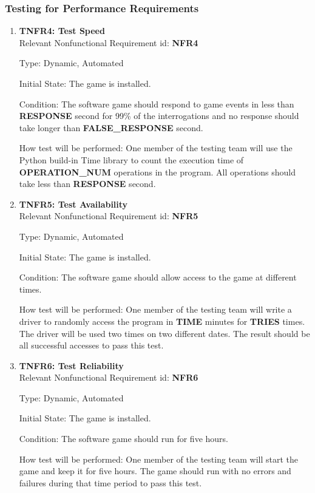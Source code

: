 \documentclass[12pt, titlepage]{article}
\begin{document}
\subsubsection{Testing for Performance Requirements}
\begin{enumerate}
\item{\textbf{TNFR4: Test Speed\\}}
Relevant Nonfunctional Requirement id: \textbf{NFR4}

Type: Dynamic, Automated

Initial State: The game is installed.

Condition: The software game should respond to game events in less than \textbf{RESPONSE} second for 99\% of the interrogations and no response should take longer than \textbf{FALSE\_RESPONSE} second.


How test will be performed: One member of the testing team will use the Python build-in Time library to count the execution time of \textbf{OPERATION\_NUM} operations in the program. All operations should take less than \textbf{RESPONSE} second.

\item{\textbf{TNFR5: Test Availability\\}}
Relevant Nonfunctional Requirement id: \textbf{NFR5}

Type: Dynamic, Automated

Initial State: The game is installed.

Condition: The software game should allow access to the game at different times.

How test will be performed: One member of the testing team will write a driver to randomly access the program in \textbf{TIME} minutes for \textbf{TRIES} times. The driver will be used two times on two different dates. The result should be all successful accesses to pass this test.

\item{\textbf{TNFR6: Test Reliability\\}}
Relevant Nonfunctional Requirement id: \textbf{NFR6}

Type: Dynamic, Automated

Initial State: The game is installed.

Condition: The software game should run for five hours.

How test will be performed: One member of the testing team will start the game and keep it for five hours. The game should run with no errors and failures during that time period to pass this test.

\end{enumerate}
\end{document}
